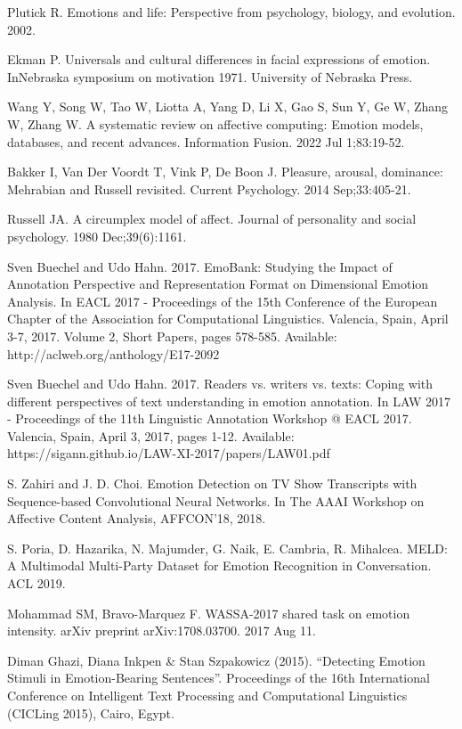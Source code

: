 \documentclass[runningheads]{llncs}
\begin{document}
\begin{thebibliography}{8}
Plutick R. Emotions and life: Perspective from psychology, biology, and evolution. 2002.

Ekman P. Universals and cultural differences in facial expressions of emotion. InNebraska symposium on motivation 1971. University of Nebraska Press.

Wang Y, Song W, Tao W, Liotta A, Yang D, Li X, Gao S, Sun Y, Ge W, Zhang W, Zhang W. A systematic review on affective computing: Emotion models, databases, and recent advances. Information Fusion. 2022 Jul 1;83:19-52.

Bakker I, Van Der Voordt T, Vink P, De Boon J. Pleasure, arousal, dominance: Mehrabian and Russell revisited. Current Psychology. 2014 Sep;33:405-21.

Russell JA. A circumplex model of affect. Journal of personality and social psychology. 1980 Dec;39(6):1161.

Sven Buechel and Udo Hahn. 2017. EmoBank: Studying the Impact of Annotation Perspective and Representation Format on Dimensional Emotion Analysis. In EACL 2017 - Proceedings of the 15th Conference of the European Chapter of the Association for Computational Linguistics. Valencia, Spain, April 3-7, 2017. Volume 2, Short Papers, pages 578-585. Available: http://aclweb.org/anthology/E17-2092

Sven Buechel and Udo Hahn. 2017. Readers vs. writers vs. texts: Coping with different perspectives of text understanding in emotion annotation. In LAW 2017 - Proceedings of the 11th Linguistic Annotation Workshop @ EACL 2017. Valencia, Spain, April 3, 2017, pages 1-12. Available: https://sigann.github.io/LAW-XI-2017/papers/LAW01.pdf

S. Zahiri and J. D. Choi. Emotion Detection on TV Show Transcripts with Sequence-based Convolutional Neural Networks. In The AAAI Workshop on Affective Content Analysis, AFFCON'18, 2018.

S. Poria, D. Hazarika, N. Majumder, G. Naik, E. Cambria, R. Mihalcea. MELD: A Multimodal Multi-Party Dataset for Emotion Recognition in Conversation. ACL 2019.

Mohammad SM, Bravo-Marquez F. WASSA-2017 shared task on emotion intensity. arXiv preprint arXiv:1708.03700. 2017 Aug 11.

Diman Ghazi, Diana Inkpen \& Stan Szpakowicz (2015). “Detecting Emotion Stimuli in Emotion-Bearing Sentences”. Proceedings of the 16th International Conference on Intelligent Text Processing and Computational Linguistics (CICLing 2015), Cairo, Egypt.


\end{thebibliography}
\end{document}
